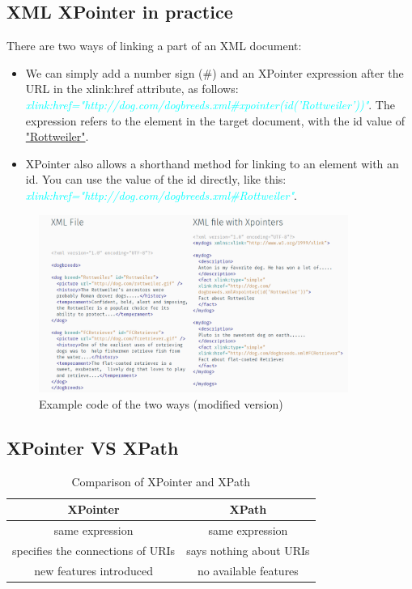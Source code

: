 \documentclass[11pt]{article}
\begin{document}
\subsection{XML XPointer in practice}

There are two ways of linking a part of an XML document:
\begin{itemize}
\item We can simply add a number sign (\#) and an XPointer expression after the URL in the xlink:href attribute, as follows:
\textcolor{cyan}{\textit{xlink:href="http://dog.com/dogbreeds.xml\#xpointer(id('Rottweiler'))"}}. The expression refers to the element in the target document, with the id value of \underline{"Rottweiler"}.
\item XPointer also allows a shorthand method for linking to an element with an id. You can use the value of the id directly, like this: \textcolor{cyan}{\textit{xlink:href="http://dog.com/dogbreeds.xml\#Rottweiler"}}.
\end{itemize}
\begin{figure}[!htb]
\centering
  \includegraphics[width=0.9\textwidth,natwidth=610,natheight=642]{images/xpointerExample.png}
  \caption{Example code of the two ways (modified version) \cite{W3CSchools}}
  \label{fig:xpointerExample}
\end{figure}
\FloatBarrier

\subsection{XPointer VS XPath}

\begin{table}[!htb]
\centering
 \begin{tabular}{||c || c||} 
 \hline
 \textbf{XPointer} & \textbf{XPath}\\ [0.5ex] 
 \hline
 same expression & same expression\\ 
 \hline
 specifies the connections of URIs & says nothing about URIs \\
 \hline
 new features introduced & no available features \\
 \hline
\end{tabular}
\caption{Comparison of XPointer and XPath}
\label{table:xpointerVSxpath}
\end{table}
\FloatBarrier
\end{document}
